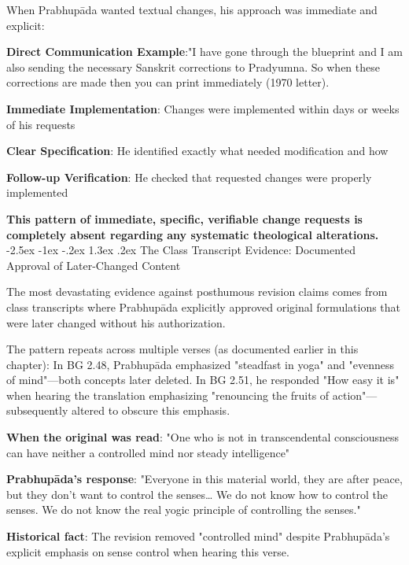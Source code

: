 \documentclass[12pt,twoside]{book}
\makeatletter
\renewcommand\section{\@startsection{section}{1}{\z@}%
{-2.5ex \@plus -1ex \@minus -.2ex}%
{1.3ex \@plus.2ex}%
{\normalfont\Large\bfseries}}
\makeatother
\begin{document}
When Prabhupāda wanted textual changes, his approach was immediate and explicit:

\textbf{\textbf{Direct Communication Example}}:"I have gone through the blueprint and I am also sending the necessary Sanskrit corrections to Pradyumna. So when these corrections are made then you can print immediately (1970 letter).

\textbf{\textbf{Immediate Implementation}}: Changes were implemented within days or weeks of his requests

\textbf{\textbf{Clear Specification}}: He identified exactly what needed modification and how

\textbf{\textbf{Follow-up Verification}}: He checked that requested changes were properly implemented

\textbf{\textbf{This pattern of immediate, specific, verifiable change requests is completely absent regarding any systematic theological alterations.}}
\section{The Class Transcript Evidence: Documented Approval of Later-Changed Content}
\label{sec:orgeb1034d}

The most devastating evidence against posthumous revision claims comes from class transcripts where Prabhupāda explicitly approved original formulations that were later changed without his authorization.

The pattern repeats across multiple verses (as documented earlier in this chapter): In BG 2.48, Prabhupāda emphasized "steadfast in yoga" and "evenness of mind"—both concepts later deleted. In BG 2.51, he responded "How easy it is" when hearing the translation emphasizing "renouncing the fruits of action"—subsequently altered to obscure this emphasis.

\textbf{\textbf{When the original was read}}: "One who is not in transcendental consciousness can have neither a controlled mind nor steady intelligence"

\textbf{\textbf{Prabhupāda's response}}: "Everyone in this material world, they are after peace, but they don't want to control the senses\ldots{} We do not know how to control the senses. We do not know the real yogic principle of controlling the senses."

\textbf{\textbf{Historical fact}}: The revision removed "controlled mind" despite Prabhupāda's explicit emphasis on sense control when hearing this verse.
\end{document}
